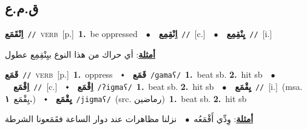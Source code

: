 \documentclass[10pt,a4paper,twoside]{article} %
\begin{document}
\begin{multicols}{2}
\vspace{-3mm}
\subsection*{\color{blue}\foreignlanguage{arabic}{ق.م.ع}\color{blue}{}} 

{\setlength\topsep{0pt}\textbf{\foreignlanguage{arabic}{اِنْقَمَع}}\ {\color{gray}\texttt{//}\color{black}}\ \textsc{verb}\ [p.]\ \textbf{1.}~be oppressed\ \ $\bullet$\ \ \setlength\topsep{0pt}\textbf{\foreignlanguage{arabic}{اِنْقِمِع}}\ {\color{gray}\texttt{//}\color{black}}\ [c.]\ \ $\bullet$\ \ \setlength\topsep{0pt}\textbf{\foreignlanguage{arabic}{يِنْقِمِع}}\ {\color{gray}\texttt{//}\color{black}}\ [i.]\  \begin{flushright}\color{gray}\foreignlanguage{arabic}{\textbf{\underline{\foreignlanguage{arabic}{أمثلة}}}: أي حراك من هذا النوع بيِنْقِمِع عطول}\end{flushright}\color{black}} \vspace{2mm}

{\setlength\topsep{0pt}\textbf{\foreignlanguage{arabic}{قَمَع}}\ {\color{gray}\texttt{//}\color{black}}\ \textsc{verb}\ [p.]\ \textbf{1.}~oppress\ \ $\smblkdiamond$\ \ \setlength\topsep{0pt}\textbf{\foreignlanguage{arabic}{قَمَع}}\ {\color{gray}\texttt{/ɡamaʕ/}\color{black}}\ \textbf{1.}~beat sb.  \textbf{2.}~hit sb\ \ $\bullet$\ \ \setlength\topsep{0pt}\textbf{\foreignlanguage{arabic}{اِقْمَع}}\ {\color{gray}\texttt{//}\color{black}}\ [c.]\ \ $\smblkdiamond$\ \ \setlength\topsep{0pt}\textbf{\foreignlanguage{arabic}{اِقْمَع}}\ {\color{gray}\texttt{/ʔiɡmaʕ/}\color{black}}\ \textbf{1.}~beat sb.  \textbf{2.}~hit sb\ \ $\bullet$\ \ \setlength\topsep{0pt}\textbf{\foreignlanguage{arabic}{يِقْمَع}}\ {\color{gray}\texttt{//}\color{black}}\ [i.]\ \color{gray}(msa. \foreignlanguage{arabic}{يِقْمَع}~\foreignlanguage{arabic}{\textbf{١.}})\color{black}\ \ $\smblkdiamond$\ \ \setlength\topsep{0pt}\textbf{\foreignlanguage{arabic}{يِقْمَع}}\ {\color{gray}\texttt{/jiɡmaʕ/}\color{black}}\ (src. \color{gray}\foreignlanguage{arabic}{رماضين}\color{black})\ \textbf{1.}~beat sb.  \textbf{2.}~hit sb\  \begin{flushright}\color{gray}\foreignlanguage{arabic}{\textbf{\underline{\foreignlanguage{arabic}{أمثلة}}}: وِدِّي أَقْمَعُه\ $\bullet$\ \  نزلنا مظاهرات عند دوار الساعة فقَمَعونا الشرطة}\end{flushright}\color{black}} \vspace{2mm}


\end{multicols}
\end{document}
